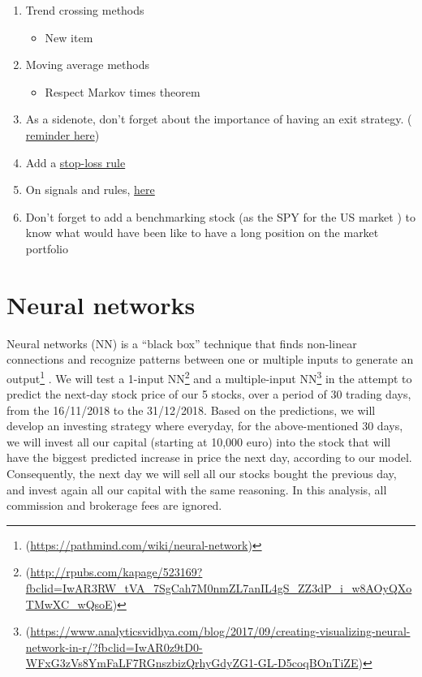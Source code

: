 \documentclass[
  11pt,
]{article}
\providecommand{\tightlist}{%
  \setlength{\itemsep}{0pt}\setlength{\parskip}{0pt}}
\begin{document}
\begin{enumerate}
\def\labelenumi{\arabic{enumi}.}
\item
  Trend crossing methods

  \begin{itemize}
  \tightlist
  \item
    New item
  \end{itemize}
\item
  Moving average methods

  \begin{itemize}
  \tightlist
  \item
    Respect Markov times theorem
  \end{itemize}
\item
  As a sidenote, don't forget about the importance of having an exit
  strategy. (
  \href{https://ntguardian.wordpress.com/2017/04/03/introduction-stock-market-data-r-2/}{reminder
  here})
\item
  Add a
  \href{https://ntguardian.wordpress.com/2017/04/24/order-type-parameter-optimization-quantstrat/}{stop-loss
  rule}
\item
  On signals and rules,
  \href{https://statsmaths.github.io/stat395-f17/assets/final_project/amarnani.html}{here}
\item
  Don't forget to add a benchmarking stock (as the SPY for the US market
  ) to know what would have been like to have a long position on the
  market portfolio
\end{enumerate}

\newpage

\hypertarget{neural-networks}{%
\section{Neural networks}\label{neural-networks}}

Neural networks (NN) is a ``black box'' technique that finds non-linear
connections and recognize patterns between one or multiple inputs to
generate an output\footnote{(\url{https://pathmind.com/wiki/neural-network})}
. We will test a 1-input NN\footnote{(\url{http://rpubs.com/kapage/523169?fbclid=IwAR3RW_tVA_7SgCah7M0nmZL7anIL4gS_ZZ3dP_i_w8AOyQXoTMwXC_wQsoE})}
and a multiple-input NN\footnote{(\url{https://www.analyticsvidhya.com/blog/2017/09/creating-visualizing-neural-network-in-r/?fbclid=IwAR0z9tD0-WFxG3zVs8YmFaLF7RGnszbizQrhyGdyZG1-GL-D5coqBOnTiZE})}
in the attempt to predict the next-day stock price of our 5 stocks, over
a period of 30 trading days, from the 16/11/2018 to the 31/12/2018.
Based on the predictions, we will develop an investing strategy where
everyday, for the above-mentioned 30 days, we will invest all our
capital (starting at 10,000 euro) into the stock that will have the
biggest predicted increase in price the next day, according to our
model. Consequently, the next day we will sell all our stocks bought the
previous day, and invest again all our capital with the same reasoning.
In this analysis, all commission and brokerage fees are ignored.
\end{document}
